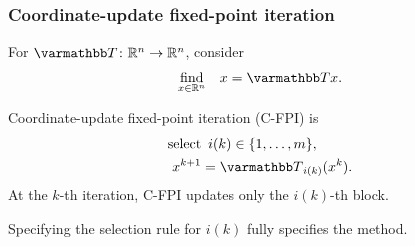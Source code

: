 \documentclass[10pt,mathserif]{beamer}
\begin{document}
\begin{frame}
\frametitle{Coordinate-update fixed-point iteration}
For $\opT\colon\reals^n\rightarrow\reals^n$, consider 
\begin{align*}
\begin{array}{ll}
\underset{x\in\reals^n}{\mbox{find}}&
x = \opT x.
\end{array}
\end{align*}
\vspace{0.2in}

Coordinate-update fixed-point iteration (C-FPI) is
\begin{align*}
\text{select}&\,\,\,i(k) \in \{1,\dots,m\},\\
x^{k+1}&= \opT_{i(k)}(x^k).
\end{align*}
At the $k$\nobreakdash-th iteration, C-FPI updates only the $i(k)$\nobreakdash-th block.
\medskip

Specifying the selection rule for $i(k)$ fully specifies the method.
\end{frame}
\end{document}
